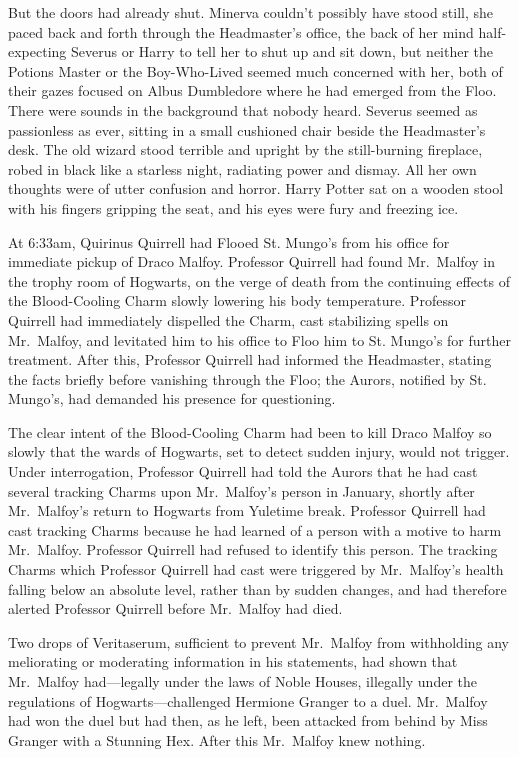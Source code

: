 But the doors had already shut.
\later
Minerva couldn't possibly have stood still, she paced back and forth through
the Headmaster's office, the back of her mind half-expecting Severus or Harry
to tell her to shut up and sit down, but neither the Potions Master or the
Boy-Who-Lived seemed much concerned with her, both of their gazes focused on
Albus Dumbledore where he had emerged from the Floo. There were sounds in the
background that nobody heard. Severus seemed as passionless as ever, sitting in
a small cushioned chair beside the Headmaster's desk. The old wizard stood
terrible and upright by the still-burning fireplace, robed in black like a
starless night, radiating power and dismay. All her own thoughts were of utter
confusion and horror. Harry Potter sat on a wooden stool with his fingers
gripping the seat, and his eyes were fury and freezing ice.

At 6:33am, Quirinus Quirrell had Flooed St. Mungo's from his office for
immediate pickup of Draco Malfoy. Professor Quirrell had found Mr.~Malfoy in
the trophy room of Hogwarts, on the verge of death from the continuing effects
of the Blood-Cooling Charm slowly lowering his body temperature. Professor
Quirrell had immediately dispelled the Charm, cast stabilizing spells on
Mr.~Malfoy, and levitated him to his office to Floo him to St. Mungo's for
further treatment. After this, Professor Quirrell had informed the Headmaster,
stating the facts briefly before vanishing through the Floo; the Aurors,
notified by St. Mungo's, had demanded his presence for questioning.

The clear intent of the Blood-Cooling Charm had been to kill Draco Malfoy so
slowly that the wards of Hogwarts, set to detect sudden injury, would not
trigger. Under interrogation, Professor Quirrell had told the Aurors that he
had cast several tracking Charms upon Mr.~Malfoy's person in January, shortly
after Mr.~Malfoy's return to Hogwarts from Yuletime break. Professor Quirrell
had cast tracking Charms because he had learned of a person with a motive to
harm Mr.~Malfoy. Professor Quirrell had refused to identify this person. The
tracking Charms which Professor Quirrell had cast were triggered by
Mr.~Malfoy's health falling below an absolute level, rather than by sudden
changes, and had therefore alerted Professor Quirrell before Mr.~Malfoy had
died.

Two drops of Veritaserum, sufficient to prevent Mr.~Malfoy from withholding any
meliorating or moderating information in his statements, had shown that
Mr.~Malfoy had---legally under the laws of Noble Houses, illegally under the
regulations of Hogwarts---challenged Hermione Granger to a duel. Mr.~Malfoy had
won the duel but had then, as he left, been attacked from behind by Miss
Granger with a Stunning Hex. After this Mr.~Malfoy knew nothing.

